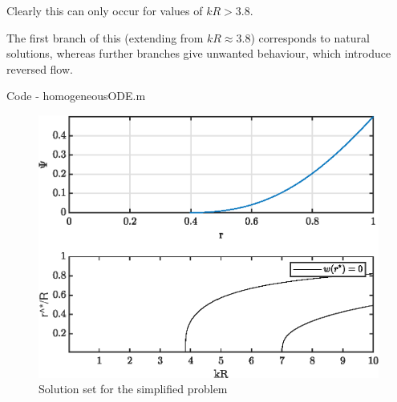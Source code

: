 \documentclass{X:/Documents/Coding/Latex/myreport}
\begin{document}
Clearly this can only occur for values of $kR > 3.8$. 

The first branch of this (extending from $kR\approx 3.8$) corresponds to natural solutions, whereas further branches give unwanted behaviour, which introduce reversed flow.

Code - homogeneousODE.m


\begin{figure}[h]
    \centering
    \label{fig:contourSolutions}
    \includegraphics[width=\linewidth]{kRstarContour}
    \caption{Solution set for the simplified problem}
\end{figure}
\newpage


\clearpage








\end{document}

